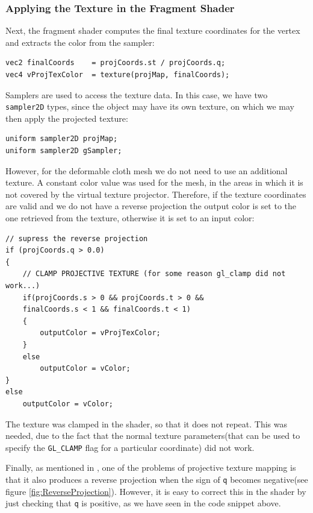 \documentclass[]{article}
\begin{document}
\subsubsection{Applying the Texture in the Fragment Shader}

Next, the fragment shader computes the final texture coordinates for the vertex and extracts the color from the sampler:
\begin{verbatim}
vec2 finalCoords	= projCoords.st / projCoords.q;
vec4 vProjTexColor  = texture(projMap, finalCoords);
\end{verbatim}

Samplers are used to access the texture data. In this case, we have two \verb|sampler2D| types, since the object may have its own texture, on which we may then apply the projected texture:
\begin{verbatim}
uniform sampler2D projMap;
uniform sampler2D gSampler;
\end{verbatim}

However, for the deformable cloth mesh we do not need to use an additional texture. A constant color value was used for the mesh, in the areas in which it is not covered by the virtual texture projector. Therefore, if the texture coordinates are valid and we do not have a reverse projection the output color is set to the one retrieved from the texture, otherwise it is set to an input color:
\begin{verbatim}
// supress the reverse projection
if (projCoords.q > 0.0)
{
    // CLAMP PROJECTIVE TEXTURE (for some reason gl_clamp did not work...)
    if(projCoords.s > 0 && projCoords.t > 0 && 
    finalCoords.s < 1 && finalCoords.t < 1)
    {
	    outputColor = vProjTexColor;
    }
    else
        outputColor = vColor;
}
else
    outputColor = vColor;
\end{verbatim}

The texture was clamped in the shader, so that it does not repeat. This was needed, due to the fact that the normal texture parameters(that can be used to specify the \verb|GL_CLAMP| flag for a particular coordinate) did not work.

Finally, as mentioned in \cite{cassNvidia}, one of the problems of projective texture mapping is that it also produces a reverse projection when the sign of \verb|q| becomes negative(see figure \ref{fig:ReverseProjection}). However, it is easy to correct this in the shader by just checking that \verb|q| is positive, as we have seen in the code snippet above.
\end{document}
